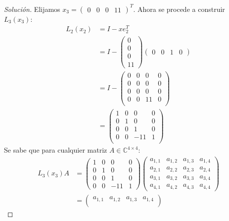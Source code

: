 \documentclass[12pt]{book}
\newcommand{\C}{\mathbb{C}}
\newenvironment{solucion}
  {\renewcommand\qedsymbol{$\square$}\begin{proof}[Solución]}
  {\end{proof}}
\begin{document}
\begin{solucion}
Elijamos $x_3=\begin{pmatrix}0&0&0&11\end{pmatrix}^T$. Ahora se procede a construir $L_3(x_3)$:
\begin{align*}
    L_2(x_2)&=I-xe_2^T\\
    &=I-\begin{pmatrix}
    0\\
    0\\
    0\\
    11
    \end{pmatrix}\begin{pmatrix}
    0 & 0 & 1 & 0
    \end{pmatrix}\\[8pt]
    &= I-\begin{pmatrix}
    0 & 0 & 0 & 0\\
    0 & 0 & 0 & 0\\
    0 & 0 & 0 & 0\\
    0 & 0 & 11 & 0\\
    \end{pmatrix}\\[8pt]
    &=\begin{pmatrix}
    1 & 0 & 0 & 0\\
    0 & 1 & 0 & 0\\
    0 & 0 & 1 & 0\\
    0 & 0 & -11 & 1\\
    \end{pmatrix}
\end{align*}
Se sabe que para cualquier matriz $A\in\C^{4\times4}$:
\begin{align*}
    L_3(x_3)A&=\begin{pmatrix}
    1 & 0 & 0 & 0\\
    0 & 1 & 0 & 0\\
    0 & 0 & 1 & 0\\
    0 & 0 & -11 & 1
    \end{pmatrix}\begin{pmatrix}
    a_{1,1} & a_{1,2} & a_{1,3} & a_{1,4}\\
    a_{2,1} & a_{2,2} & a_{2,3} & a_{2,4}\\
    a_{3,1} & a_{3,2} & a_{3,3} & a_{3,4}\\
    a_{4,1} & a_{4,2} & a_{4,3} & a_{4,4}
    \end{pmatrix}\\[8pt]
    &=\begin{pmatrix}
    a_{1,1} & a_{1,2} & a_{1,3} & a_{1,4}\\

\end{pmatrix}
\end{align*}
\end{solucion}
\end{document}
